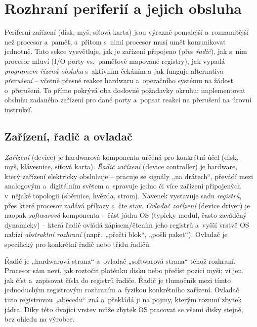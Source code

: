 \section{Rozhraní periferií a jejich obsluha}

Periferní zařízení (disk, myš, síťová karta) jsou výrazně pomalejší a~rozmanitější než procesor a~paměť, a~přitom s~nimi procesor musí umět komunikovat jednotně. Tato sekce vysvětluje, jak je zařízení připojeno (přes \emph{řadič}), jak s~ním procesor mluví (I/O porty vs.\ paměťově mapované registry), jak vypadá \emph{programem řízená obsluha} s~aktivním čekáním a~jak funguje alternativa -- \emph{přerušení} -- včetně přesné reakce hardwaru a~operačního systému na žádost o~přerušení. To přímo pokrývá oba doslovné požadavky okruhu: implementovat obsluhu zadaného zařízení pro dané porty a~popsat reakci na přerušení na úrovni instrukcí.

\subsection{Zařízení, řadič a ovladač}

\begin{definice}
\emph{Zařízení} (device) je hardwarová komponenta určená pro konkrétní účel (disk, myš, klávesnice, síťová karta). \emph{Řadič zařízení} (device controller) je hardware, který zařízení elektricky obsluhuje -- pracuje se signály „na drátech``, převádí mezi analogovým a~digitálním světem a~spravuje jedno či více zařízení připojených v~nějaké topologii (sběrnice, hvězda, strom). Navenek vystavuje sadu \emph{registrů}, přes které procesor zadává příkazy a~čte stav. \emph{Ovladač zařízení} (device driver) je naopak \emph{softwarová} komponenta -- část jádra OS (typicky modul, často zaváděný dynamicky) -- která řadič ovládá zápisem/čtením jeho registrů a~vyšší vrstvě OS nabízí \emph{abstraktní rozhraní} (např.\ „přečti blok``, „pošli paket``). Ovladač je specifický pro konkrétní řadič nebo třídu řadičů.
\end{definice}

\begin{intuice}
Řadič je „hardwarová strana`` a~ovladač „softwarová strana`` téhož rozhraní. Procesor sám neví, jak roztočit ploténku disku nebo přečíst pozici myši; ví jen, jak číst a~zapisovat čísla do registrů řadiče. Řadič je tlumočník mezi tímto jednoduchým registrovým rozhraním a~fyzikou konkrétního zařízení. Ovladač tuto registrovou „abecedu`` zná a~překládá ji na pojmy, kterým rozumí zbytek jádra. Díky této dvojici vrstev může zbytek OS pracovat se všemi disky stejně, bez ohledu na výrobce.
\end{intuice}

